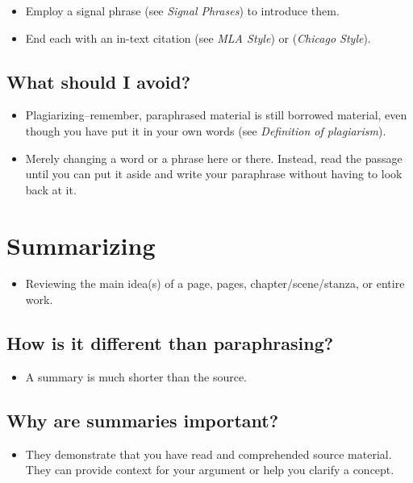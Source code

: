 \begin{itemize}
\item Employ a signal phrase (see \emph{Signal Phrases}) to introduce them.

\item End each with an in-text citation (see \emph{MLA Style}) or 
(\emph{Chicago Style}).
\end{itemize}

\subsection {What should I avoid?}

\begin{itemize}

\item Plagiarizing--remember, paraphrased material is still borrowed material, even 
though you have put it in your own words (see \emph{Definition of plagiarism}).

\item Merely changing a word or a phrase here or there. Instead, read the passage until 
you can put it aside and write your paraphrase without having to look back at it.
\end{itemize}


\section{Summarizing}

\begin{itemize}

\item Reviewing the main idea(s) of a page, pages, chapter/scene/stanza, or entire 
work.

\end{itemize}
\subsection {How is it different than paraphrasing?}

\begin{itemize}
\item A summary is much shorter than the source.
\end{itemize}
\subsection {Why are summaries important?}

\begin{itemize}
\item They demonstrate that you have read and comprehended source material. They 
can provide context for your argument or help you clarify a concept.
\end{itemize}

